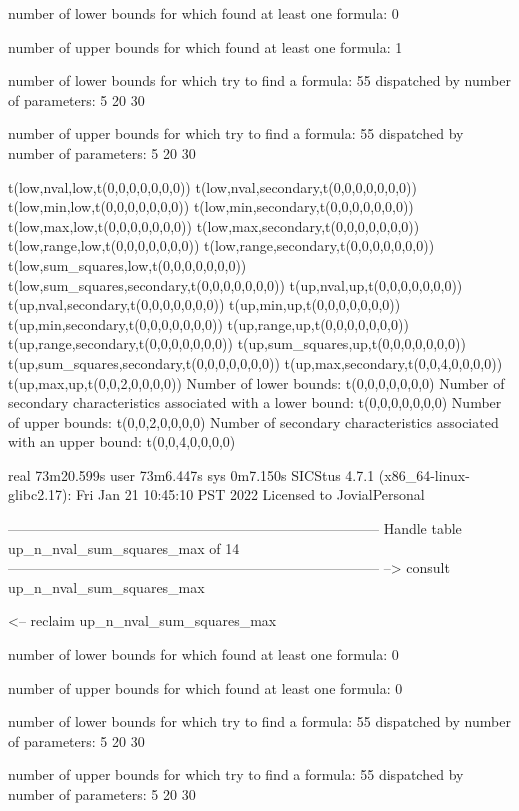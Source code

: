 number of lower bounds for which found at least one formula: 0

number of upper bounds for which found at least one formula: 1

number of lower bounds for which try to find a formula: 55
dispatched by number of parameters: 5  20  30

number of upper bounds for which try to find a formula: 55
dispatched by number of parameters: 5  20  30

t(low,nval,low,t(0,0,0,0,0,0,0))
t(low,nval,secondary,t(0,0,0,0,0,0,0))
t(low,min,low,t(0,0,0,0,0,0,0))
t(low,min,secondary,t(0,0,0,0,0,0,0))
t(low,max,low,t(0,0,0,0,0,0,0))
t(low,max,secondary,t(0,0,0,0,0,0,0))
t(low,range,low,t(0,0,0,0,0,0,0))
t(low,range,secondary,t(0,0,0,0,0,0,0))
t(low,sum_squares,low,t(0,0,0,0,0,0,0))
t(low,sum_squares,secondary,t(0,0,0,0,0,0,0))
t(up,nval,up,t(0,0,0,0,0,0,0))
t(up,nval,secondary,t(0,0,0,0,0,0,0))
t(up,min,up,t(0,0,0,0,0,0,0))
t(up,min,secondary,t(0,0,0,0,0,0,0))
t(up,range,up,t(0,0,0,0,0,0,0))
t(up,range,secondary,t(0,0,0,0,0,0,0))
t(up,sum_squares,up,t(0,0,0,0,0,0,0))
t(up,sum_squares,secondary,t(0,0,0,0,0,0,0))
t(up,max,secondary,t(0,0,4,0,0,0,0))
t(up,max,up,t(0,0,2,0,0,0,0))
Number of lower bounds:                                             t(0,0,0,0,0,0,0)
Number of secondary characteristics associated with a lower bound:  t(0,0,0,0,0,0,0)
Number of upper bounds:                                             t(0,0,2,0,0,0,0)
Number of secondary characteristics associated with an upper bound: t(0,0,4,0,0,0,0)

real	73m20.599s
user	73m6.447s
sys	0m7.150s
SICStus 4.7.1 (x86_64-linux-glibc2.17): Fri Jan 21 10:45:10 PST 2022
Licensed to JovialPersonal


--------------------------------------------------------------------------------
Handle table up_n_nval_sum_squares_max of 14
--------------------------------------------------------------------------------
--> consult up_n_nval_sum_squares_max

<-- reclaim up_n_nval_sum_squares_max

number of lower bounds for which found at least one formula: 0

number of upper bounds for which found at least one formula: 0

number of lower bounds for which try to find a formula: 55
dispatched by number of parameters: 5  20  30

number of upper bounds for which try to find a formula: 55
dispatched by number of parameters: 5  20  30

